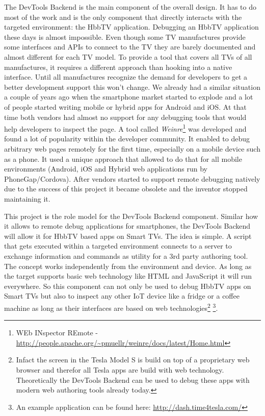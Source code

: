 The DevTools Backend is the main component of the overall design. It has to do most of the work
and is the only component that directly interacts with the targeted environment: the HbbTV
application. Debugging an HbbTV application these days is almost impossible. Even though some TV
manufactures provide some interfaces and APIs to connect to the TV they are barely documented and
almost different for each TV model. To provide a tool that covers all TVs of all manufactures, it
requires a different approach than hooking into a native interface. Until all manufactures recognize
the demand for developers to get a better development support this won't change. We already had a
similar situation a couple of years ago when the smartphone market started to explode and a lot of
people started writing mobile or hybrid apps for Android and iOS. At that time both vendors had
almost no support for any debugging tools that would help developers to inspect the page. A tool
called \textit{Weinre}\footnote{WEb INspector REmote - \url{http://people.apache.org/~pmuellr/weinre/docs/latest/Home.html}}
was developed and found a lot of popularity within the developer community. It enabled to debug
arbitrary web pages remotely for the first time, especially on a mobile device such as a phone. It
used a unique approach that allowed to do that for all mobile environments (Android, iOS and Hybrid
web applications run by PhoneGap/Cordova). After vendors started to support remote debugging natively
due to the success of this project it became obsolete and the inventor stopped maintaining it.

This project is the role model for the DevTools Backend component. Similar how it allows to remote
debug applications for smartphones, the DevTools Backend will allow it for HbbTV based apps on Smart
TVs. The idea is simple. A script that gets executed within a targeted environment connects to a
server to exchange information and commands as utility for a 3rd party authoring tool. The concept works
independently from the environment and device. As long as the target supports basic web technology
like HTML and JavaScript it will run everywhere. So this component can not only be used to debug HbbTV
apps on Smart TVs but also to inspect any other IoT device like a fridge or a coffee machine as long
as their interfaces are based on web technologies\footnote{Infact the screen in the Tesla Model S
is build on top of a proprietary web browser and therefor all Tesla apps are build with web
technology. Theoretically the DevTools Backend can be used to debug these apps with modern web
authoring tools already today.} \footnote{An example application can be found here: \url{http://dash.time4tesla.com/}}.

